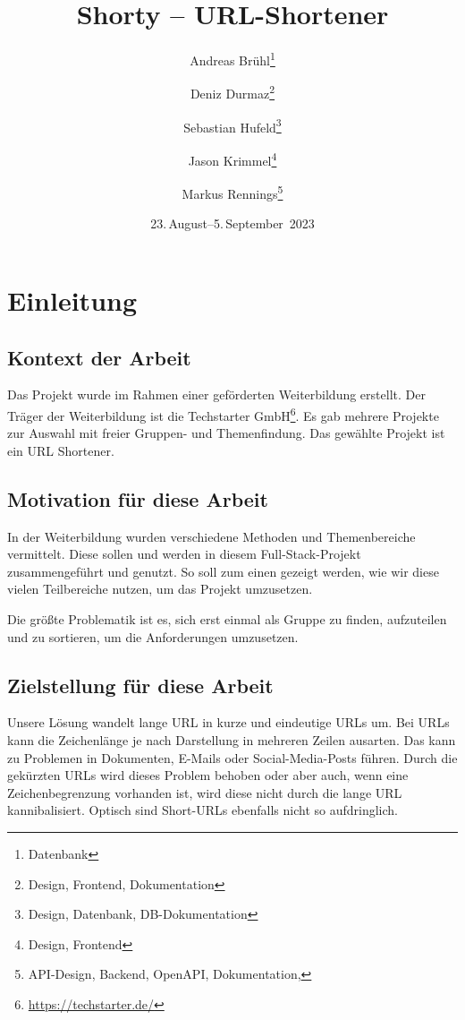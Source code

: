 \documentclass[a4paper,11pt,DIV=12,overfullrule=on]{scrreprt}%
\title{Shorty – URL-Shortener}
\subtitle{}
\author{Andreas Brühl\thanks{Datenbank} \and Deniz Durmaz\thanks{Design, Frontend, Dokumentation} \and Sebastian Hufeld\thanks{Design, Datenbank, DB-Dokumentation} \and Jason Krimmel\thanks{Design, Frontend} \and Markus Rennings\thanks{API-Design, Backend, OpenAPI, Dokumentation, \XeLaTeX}}
\date{23.\,August–5.\,September~2023}
\begin{document}
\maketitle

\tableofcontents

\chapter{Einleitung}
\section{Kontext der Arbeit}
Das Projekt wurde im Rahmen einer geförderten Weiterbildung erstellt. Der Träger der Weiterbildung ist die Techstarter GmbH\footnote{\href{https://techstarter.de/}{https://techstarter.de/}}. Es gab mehrere Projekte zur Auswahl mit freier Gruppen- und Themenfindung. Das gewählte Projekt ist ein URL Shortener.

\section{Motivation für diese Arbeit}
In der Weiterbildung wurden verschiedene Methoden und Themenbereiche vermittelt. Diese sollen und werden in diesem Full-Stack-Projekt zusammengeführt und genutzt. So soll zum einen gezeigt werden, wie wir diese vielen Teilbereiche nutzen, um das Projekt umzusetzen.

Die größte Problematik ist es, sich erst einmal als Gruppe zu finden, aufzuteilen und zu sortieren, um die Anforderungen umzusetzen.

\section{Zielstellung für diese Arbeit}
Unsere Lösung wandelt lange \ac{URL} in kurze und eindeutige \ac{URL}s um. Bei \ac{URL}s kann die Zeichenlänge je nach Darstellung in mehreren Zeilen ausarten. Das kann zu Problemen in Dokumenten, E-Mails oder Social-Media-Posts führen. Durch die gekürzten \ac{URL}s wird dieses Problem behoben oder aber auch, wenn eine Zeichenbegrenzung vorhanden ist, wird diese nicht durch die lange \ac{URL} kannibalisiert. Optisch sind Short-\ac{URL}s ebenfalls nicht so aufdringlich.
\end{document}
